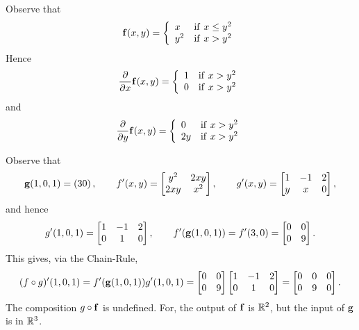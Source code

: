 \begin{Answer}{3.7}
Observe that
$$\mathbf{ f}(x,y)=\left\{\begin{array}{ll} x & \mathrm{if}\ x \leq y^2 \\   y^2 & \mathrm{if}\ x > y^2 \\ \end{array}\right. $$
Hence
$$\dfrac{\partial}{\partial x}\mathbf{ f}(x,y)=\left\{\begin{array}{ll} 1 & \mathrm{if}\ x > y^2 \\   0 & \mathrm{if}\ x > y^2 \\ \end{array}  \right. $$ and
$$\dfrac{\partial}{\partial y}\mathbf{ f}(x,y)=\left\{\begin{array}{ll} 0 & \mathrm{if}\ x > y^2 \\   2y & \mathrm{if}\ x > y^2 \\ \end{array}\right. $$
\end{Answer}
\begin{Answer}{3.8}
Observe that
$$\mathbf{ g}(1,0,1) = \left( 3 \\ 0 \right), \qquad f'(x,y) = \begin{bmatrix} y^2 &
2xy \cr 2xy & x^2
\end{bmatrix}, \qquad g'(x,y) =\begin{bmatrix} 1 & -1 & 2  \cr y & x & 0
\cr
\end{bmatrix},  $$
and hence
$$ g'(1,0,1) = \begin{bmatrix} 1 & -1 & 2  \cr 0 & 1 & 0
\cr
\end{bmatrix},\qquad  f'(\mathbf{ g}(1,0,1)) =  f'(3,0) = \begin{bmatrix} 0  &  0  \cr 0 & 9
\cr
\end{bmatrix}. $$This gives, via the Chain-Rule,
$$(f\circ g)'(1,0,1)  = f'(\mathbf{ g}(1,0,1))g'(1,0,1) = \begin{bmatrix} 0  &  0  \cr 0 & 9
\cr
\end{bmatrix}\begin{bmatrix} 1 & -1 & 2  \cr 0 & 1 & 0
\cr
\end{bmatrix} = \begin{bmatrix} 0 & 0 & 0  \cr 0 & 9 & 0
\cr
\end{bmatrix}. $$
The composition $g\circ \mathbf{ f}$ is undefined. For, the output of $\mathbf{ f}$ is
$\mathbb{R}^2$, but the input of $\mathbf{ g}$ is in $\mathbb{R}^3$.

\end{Answer}
